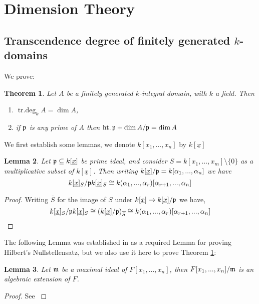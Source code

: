 \documentclass[12pt]{article}
\theoremstyle{plain}
\newtheorem{thm}{Theorem}[subsection] %
\newtheorem{lemma}[thm]{Lemma}
\theoremstyle{definition}
\begin{document}
\section{Dimension Theory}
\subsection{Transcendence degree of finitely generated $k$-domains}
We prove:
\begin{thm}
\label{thm:onepointeight}
Let $A$ be a finitely generated $k$-integral domain, with $k$ a field. Then
\begin{enumerate}
    \item\label{thm:onepointeighta} $\operatorname{tr.deg}_kA = \operatorname{dim}A$,
    \item\label{thm:onepointeightb} if $\frak{p}$ is any prime of $A$ then $\operatorname{ht.}\frak{p} + \operatorname{dim}A/\frak{p} = \operatorname{dim}A$
\end{enumerate}
\end{thm}
We first establish some lemmas, we denote $k[x_1,...,x_n]$ by $k[\underline{x}]$
\begin{lemma}
\label{lem:notationdance}
Let $\frak{p} \subseteq k[\underline{x}]$ be prime ideal, and consider $S = k[x_1,...,x_m]\setminus\lbrace 0 \rbrace$ as a multiplicative subset of $k[\underline{x}]$. Then writing $k[\underline{x}]/\frak{p} = k[\alpha_1,...,\alpha_n]$ we have
\[k[\underline{x}]_S/\frak{p}k[\underline{x}]_S \cong k(\alpha_1,...,\alpha_r)[\alpha_{r+1},...,\alpha_n]\]
\end{lemma}
\begin{proof}
Writing $\overline{S}$ for the image of $S$ under $k[\underline{x}] \to k[\underline{x}]/\frak{p}$ we have,
\[k[\underline{x}]_S/\frak{p}k[\underline{x}]_S \cong (k[\underline{x}]/\frak{p})_{\overline{S}} \cong k(\alpha_1,...,\alpha_r)[\alpha_{r+1},...,\alpha_n]\]
\end{proof}
The following Lemma was established in \cite{com_alg_notes} as a required Lemma for proving Hilbert's Nullstellensatz, but we also use it here to prove Theorem \ref{thm:onepointeight}:
\begin{lemma}
\label{lem:algebraic}
Let $\frak{m}$ be a maximal ideal of $F[x_1,...,x_n]$, then $F[x_1,...,x_n]/\frak{m}$ is an algebraic extension of $F$.
\end{lemma}
\begin{proof}
See \cite[\S 2.1]{com_alg_notes}
\end{proof}
\end{document}
